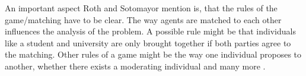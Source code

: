 An important aspect Roth and Sotomayor mention is, that the rules of the game/matching have to be clear.
The way agents are matched to each other influences the analysis of the problem.
A possible rule might be that individuals like a student and university are only brought together if both parties agree to the matching.
Other rules of a game might be the way one individual proposes to another, whether there exists a moderating individual and many more \cite[p. 492]{roth1992two}.